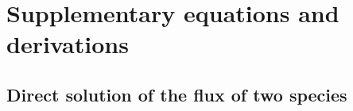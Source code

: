 \chapter{Supplementary equations and derivations}
\label{app:ch:eqn}
\section{Direct solution of the flux of two species}
